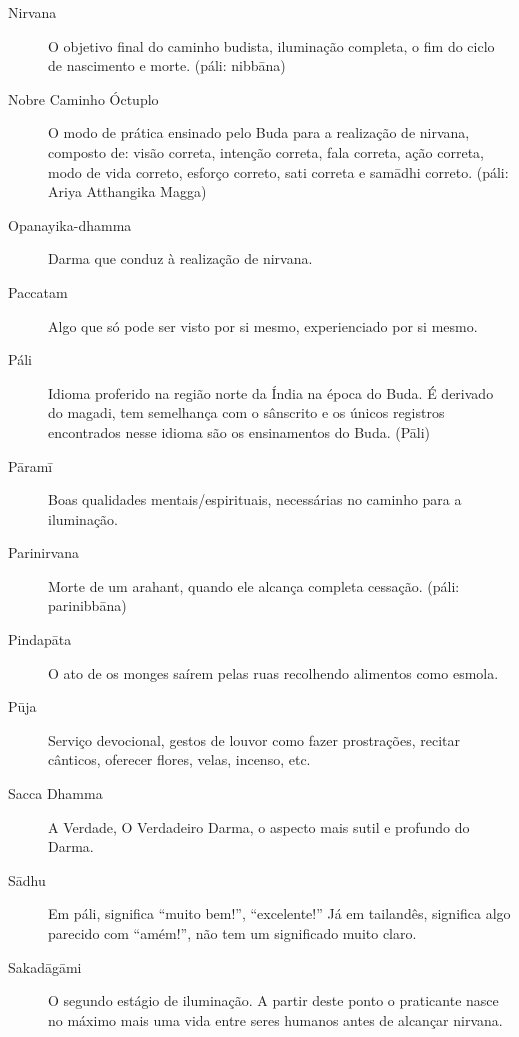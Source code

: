 \begin{description}
  \item[Nirvana] O objetivo final do caminho budista, iluminação completa, o fim do ciclo de nascimento e morte. (páli: nibbāna)

  \item[Nobre Caminho Óctuplo] O modo de prática ensinado pelo Buda para a realização de nirvana, composto de: visão correta, intenção correta, fala correta, ação correta, modo de vida correto, esforço correto, sati correta e samādhi correto. (páli: Ariya Atthangika Magga)

  \item[Opanayika-dhamma] Darma que conduz à realização de nirvana. 

  \item[Paccatam] Algo que só pode ser visto por si mesmo, experienciado por si mesmo. 

  \item[Páli] Idioma proferido na região norte da Índia na época do Buda. É derivado do magadi, tem semelhança com o sânscrito e os únicos registros encontrados nesse idioma são os ensinamentos do Buda. (Pāli)

  \item[Pāramī] Boas qualidades mentais/espirituais, necessárias no caminho para a iluminação. 

  \item[Parinirvana] Morte de um arahant, quando ele alcança completa cessação. (páli: parinibbāna)

  \item[Pindapāta] O ato de os monges saírem pelas ruas recolhendo alimentos como esmola. 

  \item[Pūja] Serviço devocional, gestos de louvor como fazer prostrações, recitar cânticos, oferecer flores, velas, incenso, etc.

  \item[Sacca Dhamma] A Verdade, O Verdadeiro Darma, o aspecto mais sutil e profundo do Darma.

  \item[Sādhu] Em páli, significa “muito bem!”, “excelente!” Já em tailandês, significa algo parecido com “amém!”, não tem um significado muito claro.

  \item[Sakadāgāmi] O segundo estágio de iluminação. A partir deste ponto o praticante nasce no máximo mais uma vida entre seres humanos antes de alcançar nirvana.


\end{description}

